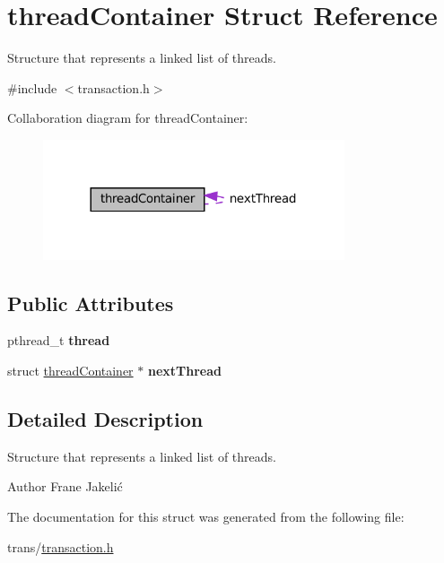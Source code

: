 \hypertarget{structthreadContainer}{}\section{thread\+Container Struct Reference}
\label{structthreadContainer}


Structure that represents a linked list of threads.  




{\ttfamily \#include $<$transaction.\+h$>$}



Collaboration diagram for thread\+Container\+:\nopagebreak
\begin{figure}[H]
\begin{center}
\leavevmode
\includegraphics[width=252pt]{structthreadContainer__coll__graph}
\end{center}
\end{figure}
\subsection*{Public Attributes}
\begin{DoxyCompactItemize}
\item 
\mbox{\label{structthreadContainer_aec4a9c751d5d1202bafdfbb769c4a3b0}} 
pthread\+\_\+t {\bfseries thread}
\item 
\mbox{\label{structthreadContainer_a07e020d387df3d860a0cee5d5e8d4237}} 
struct \hyperlink{structthreadContainer}{thread\+Container} $\ast$ {\bfseries next\+Thread}
\end{DoxyCompactItemize}


\subsection{Detailed Description}
Structure that represents a linked list of threads. 

\begin{DoxyAuthor}{Author}
Frane Jakelić 
\end{DoxyAuthor}


The documentation for this struct was generated from the following file\+:\begin{DoxyCompactItemize}
\item 
trans/\hyperlink{transaction_8h}{transaction.\+h}\end{DoxyCompactItemize}
